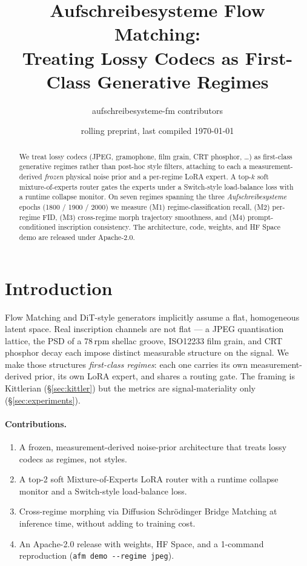 \documentclass[10pt,a4paper]{article}
\title{Aufschreibesysteme Flow Matching: \\
       Treating Lossy Codecs as First-Class Generative Regimes}
\author{aufschreibesysteme-fm contributors}
\date{rolling preprint, last compiled \today}
\begin{document}
\maketitle

\begin{abstract}
We treat lossy codecs (JPEG, gramophone, film grain, CRT phosphor, \dots)
as first-class generative regimes rather than post-hoc style filters,
attaching to each a measurement-derived \emph{frozen} physical noise
prior and a per-regime LoRA expert. A top-$k$ soft mixture-of-experts
router gates the experts under a Switch-style load-balance loss with a
runtime collapse monitor. On seven regimes spanning the three
\emph{Aufschreibesysteme} epochs (1800 / 1900 / 2000) we measure (M1)
regime-classification recall, (M2) per-regime FID, (M3) cross-regime
morph trajectory smoothness, and (M4) prompt-conditioned inscription
consistency. The architecture, code, weights, and HF Space demo are
released under Apache-2.0.
\end{abstract}

\section{Introduction}\label{sec:intro}

Flow Matching and DiT-style generators implicitly assume a flat,
homogeneous latent space. Real inscription channels are not flat — a
JPEG quantisation lattice, the PSD of a 78\,rpm shellac groove,
ISO12233 film grain, and CRT phosphor decay each impose distinct
measurable structure on the signal. We make those structures
\emph{first-class regimes}: each one carries its own measurement-derived
prior, its own LoRA expert, and shares a routing gate. The framing is
Kittlerian (\S\ref{sec:kittler}) but the metrics are signal-materiality
only (\S\ref{sec:experiments}).

\paragraph{Contributions.}
\begin{enumerate}
    \item A frozen, measurement-derived noise-prior architecture that
          treats lossy codecs as regimes, not styles.
    \item A top-2 soft Mixture-of-Experts LoRA router with a runtime
          collapse monitor and a Switch-style load-balance loss.
    \item Cross-regime morphing via Diffusion Schr\"odinger Bridge
          Matching at inference time, without adding to training cost.
    \item An Apache-2.0 release with weights, HF Space, and a 1-command
          reproduction (\verb|afm demo --regime jpeg|).
\end{enumerate}
\end{document}
